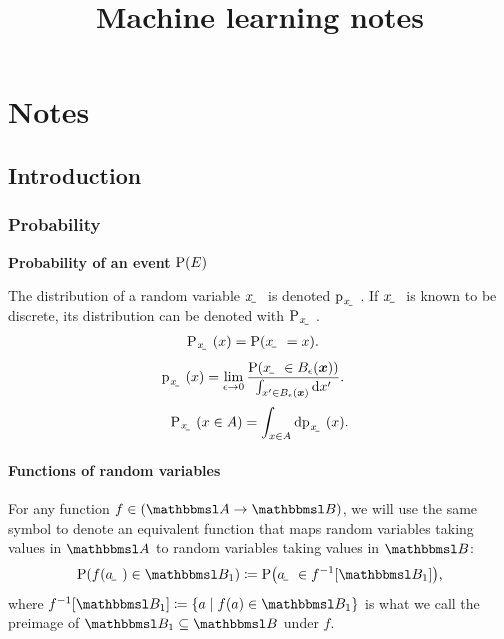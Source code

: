 \documentclass[oneside]{book}
\title{Machine learning notes}
\author{}
\date{}
\begin{document}
\maketitle

\tableofcontents

\newpage

\begingroup
\onehalfspacing
\printunsrtglossary[type=symbols,style=supergroup,title={Notation}]
\endgroup


\part{Notes}



\iffalse
\chapter{Introduction}


\section{Probability}


\textbf{Probability of an event} $\P(E)$

The distribution of a random variable $\rvar x$ is denoted $\p_\rvar{x}$. If $\rvar x$ is known to be discrete, its distribution can be denoted with $\P_\rvar{x}$. 
\begin{align}
    \P_\rvar{x}(x) &= \P(\rvar x = x) \text.
\end{align}
\begin{align}
    \p_\rvar{x}(x) &= \lim_{\epsilon\to0}\frac{\P\del{\rvar x\in B_\epsilon(\vec x)}}{\int_{x'\in B_\epsilon(\vec x)}\dif x'} \text.
\end{align}
\begin{align}
    \P_\rvar{x}(x\in A) = \int_{x\in A}\dif \p_\rvar{x}(x) \text.
\end{align}

\subsection{Functions of random variables}

For any function $f\in(\set A\to\set B)$, we will use the same symbol to denote an equivalent function that maps random variables taking values in $\set A$ to random variables taking values in $\set B$:
\begin{align}
    \P(f(\rvar a)\in \set B_1) \coloneqq \P\del{\rvar a\in f^{-1}\sbr{\set B_1}} \text,
\end{align}
where $f^{-1}\sbr{\set B_1} \coloneqq \cbr{a\mid f(a)\in \set B_1}$ is what we call the preimage of $\set B_1\subseteq\set B$ under $f$.
\end{document}
